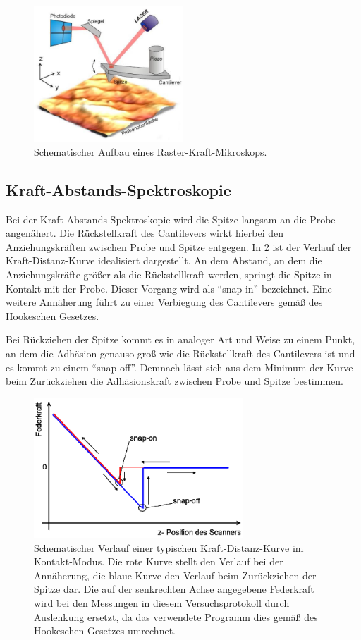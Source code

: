 \documentclass[
	a4paper,
	12pt,
	pagesize,
	ngerman
]{scrartcl}
\begin{document}
	\begin{figure}[H]
		\includegraphics[width=0.5\textwidth]{images/sonstiges/Aufbau}
		\centering
		\caption{Schematischer Aufbau eines Raster-Kraft-Mikroskops. \cite{Anleitung}}
		\label{fig_Aufbau}
		\centering
	\end{figure}

	\subsection{Kraft-Abstands-Spektroskopie}
	Bei der Kraft-Abstands-Spektroskopie wird die Spitze langsam an die Probe angenähert.
	Die Rückstellkraft des Cantilevers wirkt hierbei den Anziehungskräften zwischen Probe und Spitze entgegen.
	In \cref{fig_KDS} ist der Verlauf der Kraft-Distanz-Kurve idealisiert dargestellt.
	An dem Abstand, an dem die Anziehungskräfte größer als die Rückstellkraft werden, springt die Spitze in Kontakt mit der Probe.
	Dieser Vorgang wird als \enquote{snap-in} bezeichnet.
	Eine weitere Annäherung führt zu einer Verbiegung des Cantilevers gemäß des Hookeschen Gesetzes.

	Bei Rückziehen der Spitze kommt es in analoger Art und Weise zu einem Punkt, an dem die Adhäsion genauso groß wie die Rückstellkraft des Cantilevers ist und es kommt zu einem \enquote{snap-off}.
	Demnach lässt sich aus dem Minimum der Kurve beim Zurückziehen die Adhäsionskraft zwischen Probe und Spitze bestimmen.

	\begin{figure}[H]
		\includegraphics[width=0.7\textwidth]{images/sonstiges/KDS}
		\centering
		\caption{Schematischer Verlauf einer typischen Kraft-Distanz-Kurve im Kontakt-Modus. Die rote Kurve stellt den Verlauf bei der Annäherung, die blaue Kurve den Verlauf beim Zurückziehen der Spitze dar. Die auf der senkrechten Achse angegebene Federkraft wird bei den Messungen in diesem Versuchsprotokoll durch Auslenkung ersetzt, da das verwendete Programm dies gemäß des Hookeschen Gesetzes umrechnet. \cite{Anleitung}}
		\label{fig_KDS}
		\centering
	\end{figure}
\end{document}
